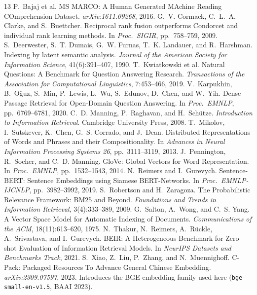 \documentclass[11pt,a4paper]{article}
\newcommand{\code}[1]{\texttt{#1}}
\begin{document}
\begin{thebibliography}{13}\small
{} P.~Bajaj et al. MS MARCO: A Human Generated MAchine Reading COmprehension Dataset. \emph{arXiv:1611.09268}, 2016.
 G.~V. Cormack, C.~L.~A. Clarke, and S.~Buettcher. Reciprocal rank fusion outperforms Condorcet and individual rank learning methods. In \emph{Proc.\ SIGIR}, pp.~758--759, 2009.
 S.~Deerwester, S.~T. Dumais, G.~W. Furnas, T.~K. Landauer, and R.~Harshman. Indexing by latent semantic analysis. \emph{Journal of the American Society for Information Science}, 41(6):391--407, 1990.
 T.~Kwiatkowski et al. Natural Questions: A Benchmark for Question Answering Research. \emph{Transactions of the Association for Computational Linguistics}, 7:453--466, 2019.
 V.~Karpukhin, B.~O{\u{g}}uz, S.~Min, P.~Lewis, L.~Wu, S.~Edunov, D.~Chen, and W.~Yih. Dense Passage Retrieval for Open-Domain Question Answering. In \emph{Proc.\ EMNLP}, pp.~6769--6781, 2020.
 C.~D. Manning, P.~Raghavan, and H.~Sch\"utze. \emph{Introduction to Information Retrieval}. Cambridge University Press, 2008.
 T.~Mikolov, I.~Sutskever, K.~Chen, G.~S. Corrado, and J.~Dean. Distributed Representations of Words and Phrases and their Compositionality. In \emph{Advances in Neural Information Processing Systems 26}, pp.~3111--3119, 2013.
 J.~Pennington, R.~Socher, and C.~D. Manning. GloVe: Global Vectors for Word Representation. In \emph{Proc.\ EMNLP}, pp.~1532--1543, 2014.
 N.~Reimers and I.~Gurevych. Sentence-BERT: Sentence Embeddings using Siamese BERT-Networks. In \emph{Proc.\ EMNLP-IJCNLP}, pp.~3982--3992, 2019.
 S.~Robertson and H.~Zaragoza. The Probabilistic Relevance Framework: BM25 and Beyond. \emph{Foundations and Trends in Information Retrieval}, 3(4):333--389, 2009.
 G.~Salton, A.~Wong, and C.~S. Yang. A Vector Space Model for Automatic Indexing of Documents. \emph{Communications of the ACM}, 18(11):613--620, 1975.
 N.~Thakur, N.~Reimers, A.~R\"uckle, A.~Srivastava, and I.~Gurevych. BEIR: A Heterogeneous Benchmark for Zero-shot Evaluation of Information Retrieval Models. In \emph{NeurIPS Datasets and Benchmarks Track}, 2021.
 S.~Xiao, Z.~Liu, P.~Zhang, and N.~Muennighoff. C-Pack: Packaged Resources To Advance General Chinese Embedding. \emph{arXiv:2309.07597}, 2023. Introduces the BGE embedding family used here (\code{bge-small-en-v1.5}, BAAI 2023).
\end{thebibliography}
\end{document}
